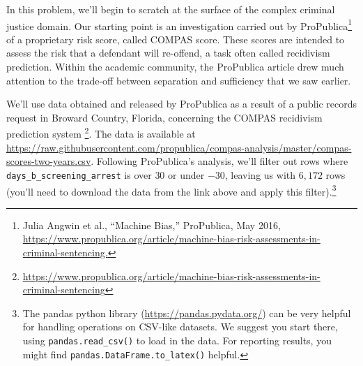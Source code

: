 \documentclass[preview]{standalone}
\begin{document}
In this problem, we’ll begin to scratch at the surface of the complex criminal justice domain. Our starting point is an investigation carried out by ProPublica\footnote{Julia Angwin et al., “Machine Bias,” ProPublica, May 2016, \url{https://www.propublica.org/article/machine-bias-risk-assessments-in-criminal-sentencing.}} 
of a proprietary risk score, called COMPAS score. These scores are intended to assess the risk that a defendant will re-offend, a task often called recidivism prediction. Within the academic community, the ProPublica article drew much attention to the trade-off between separation and sufficiency that we saw earlier.


We’ll use data obtained and released by ProPublica as a result of a public records request in Broward Country, Florida, concerning the COMPAS recidivism prediction system
\footnote{\url{https://www.propublica.org/article/machine-bias-risk-assessments-in-criminal-sentencing}}. The data is available at \url{https://raw.githubusercontent.com/propublica/compas-analysis/master/compas-scores-two-years.csv}. 
Following ProPublica’s analysis, we’ll filter out rows where \texttt{days\_b\_screening\_arrest} is over $30$ or under $-30$, leaving us with $6,172$ rows (you'll need to download the data from the link above and apply this filter).\footnote{The pandas python library ({\url{https://pandas.pydata.org/}}) can be very helpful for handling operations on CSV-like datasets. We suggest you start there, using \texttt{pandas.read\_csv()} to load in the data. For reporting results, you might find \texttt{pandas.DataFrame.to\_latex()} helpful.}
\end{document}
